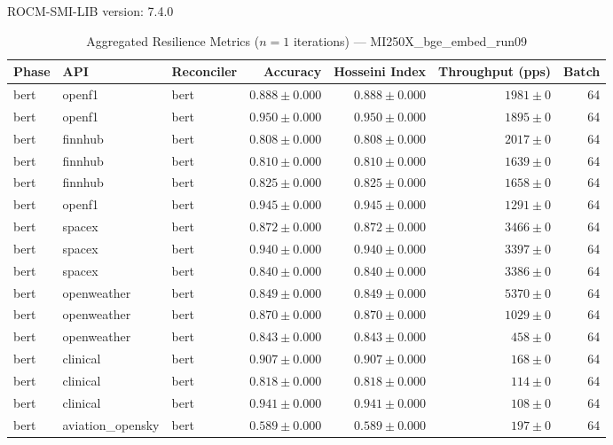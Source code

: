 ROCM-SMI-LIB version: 7.4.0

\begin{table}[htbp]
\caption{Aggregated Resilience Metrics ($n=1$ iterations) --- MI250X_bge_embed_run09}
\begin{tabular}{l l l r r r r}
\hline
Phase & API & Reconciler & Accuracy & Hosseini Index & Throughput (pps) & Batch \\
\hline
bert & openf1 & bert & $0.888\pm0.000$ & $0.888\pm0.000$ & $1981\pm0$ & 64 \\
bert & openf1 & bert & $0.950\pm0.000$ & $0.950\pm0.000$ & $1895\pm0$ & 64 \\
bert & finnhub & bert & $0.808\pm0.000$ & $0.808\pm0.000$ & $2017\pm0$ & 64 \\
bert & finnhub & bert & $0.810\pm0.000$ & $0.810\pm0.000$ & $1639\pm0$ & 64 \\
bert & finnhub & bert & $0.825\pm0.000$ & $0.825\pm0.000$ & $1658\pm0$ & 64 \\
bert & openf1 & bert & $0.945\pm0.000$ & $0.945\pm0.000$ & $1291\pm0$ & 64 \\
bert & spacex & bert & $0.872\pm0.000$ & $0.872\pm0.000$ & $3466\pm0$ & 64 \\
bert & spacex & bert & $0.940\pm0.000$ & $0.940\pm0.000$ & $3397\pm0$ & 64 \\
bert & spacex & bert & $0.840\pm0.000$ & $0.840\pm0.000$ & $3386\pm0$ & 64 \\
bert & openweather & bert & $0.849\pm0.000$ & $0.849\pm0.000$ & $5370\pm0$ & 64 \\
bert & openweather & bert & $0.870\pm0.000$ & $0.870\pm0.000$ & $1029\pm0$ & 64 \\
bert & openweather & bert & $0.843\pm0.000$ & $0.843\pm0.000$ & $458\pm0$ & 64 \\
bert & clinical & bert & $0.907\pm0.000$ & $0.907\pm0.000$ & $168\pm0$ & 64 \\
bert & clinical & bert & $0.818\pm0.000$ & $0.818\pm0.000$ & $114\pm0$ & 64 \\
bert & clinical & bert & $0.941\pm0.000$ & $0.941\pm0.000$ & $108\pm0$ & 64 \\
bert & aviation\_opensky & bert & $0.589\pm0.000$ & $0.589\pm0.000$ & $197\pm0$ & 64 \\

\end{tabular}
\end{table}
